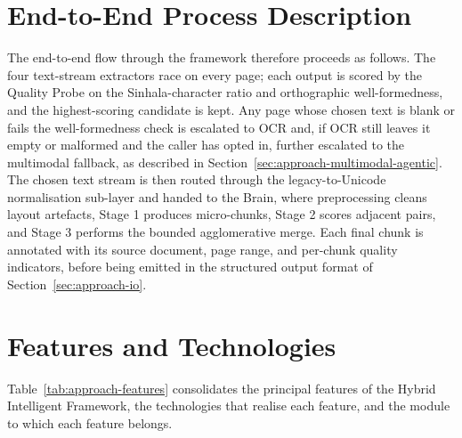 \documentclass[12pt,a4paper,oneside]{report}
\begin{document}
\section{End-to-End Process Description}
\label{sec:approach-process}
The end-to-end flow through the framework therefore proceeds as follows. The four text-stream extractors race on every page; each output is scored by the Quality Probe on the Sinhala-character ratio and orthographic well-formedness, and the highest-scoring candidate is kept. Any page whose chosen text is blank or fails the well-formedness check is escalated to OCR and, if OCR still leaves it empty or malformed and the caller has opted in, further escalated to the multimodal fallback, as described in Section~\ref{sec:approach-multimodal-agentic}. The chosen text stream is then routed through the legacy-to-Unicode normalisation sub-layer and handed to the Brain, where preprocessing cleans layout artefacts, Stage 1 produces micro-chunks, Stage 2 scores adjacent pairs, and Stage 3 performs the bounded agglomerative merge. Each final chunk is annotated with its source document, page range, and per-chunk quality indicators, before being emitted in the structured output format of Section~\ref{sec:approach-io}.

\section{Features and Technologies}
\label{sec:approach-features}
Table~\ref{tab:approach-features} consolidates the principal features of the Hybrid Intelligent Framework, the technologies that realise each feature, and the module to which each feature belongs.
\end{document}
